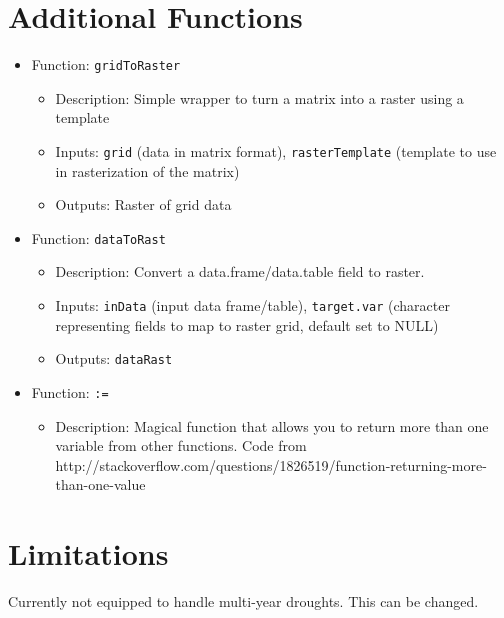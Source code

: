 \documentclass[11pt]{article}
\begin{document}
\section{Additional Functions}
\begin{itemize}
\item Function: \verb!gridToRaster!
	\begin{itemize}
	\item Description: Simple wrapper to turn a matrix into a raster using a template
    \item Inputs: \verb!grid! (data in matrix format), \verb!rasterTemplate! (template to use in rasterization of the matrix)
    \item Outputs: Raster of grid data
	\end{itemize}
\item Function: \verb!dataToRast!
	\begin{itemize}
	\item Description: Convert a data.frame/data.table field to raster.
	\item Inputs: \verb!inData! (input data frame/table), \verb!target.var! (character representing fields to map to raster grid, default set to NULL)
	\item Outputs: \verb!dataRast!
	\end{itemize}
\item Function: \verb!:=!
	\begin{itemize}
	\item Description: Magical function that allows you to return more than one variable from other functions. Code from http://stackoverflow.com/questions/1826519/function-returning-more-than-one-value
	\end{itemize}
\end{itemize}




\section{Limitations}
Currently not equipped to handle multi-year droughts. This can be changed. 
\end{document}
